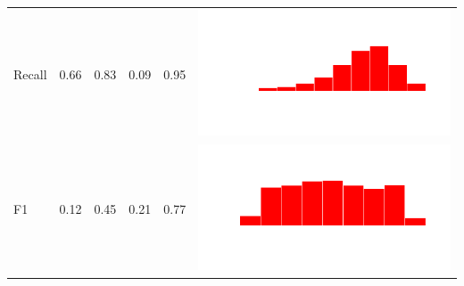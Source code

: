 \documentclass[conference]{IEEEtran}
\begin{document}
\begin{table}
\begin{tabular}{lrrrrc}
    Recall & 0.66 & 0.83 & 0.09 & 0.95 & \includegraphics[scale = 0.1, clip = true, trim= 50px 60px 50px 60px]{../figs/hist-results/hist-LRrec.pdf} \\
    F1 & 0.12 & 0.45 & 0.21 & 0.77 & \includegraphics[scale = 0.1, clip = true, trim= 50px 60px 50px 60px]{../figs/hist-results/hist-LRf1.pdf} \\


\end{tabular}
\end{table}
\end{document}
